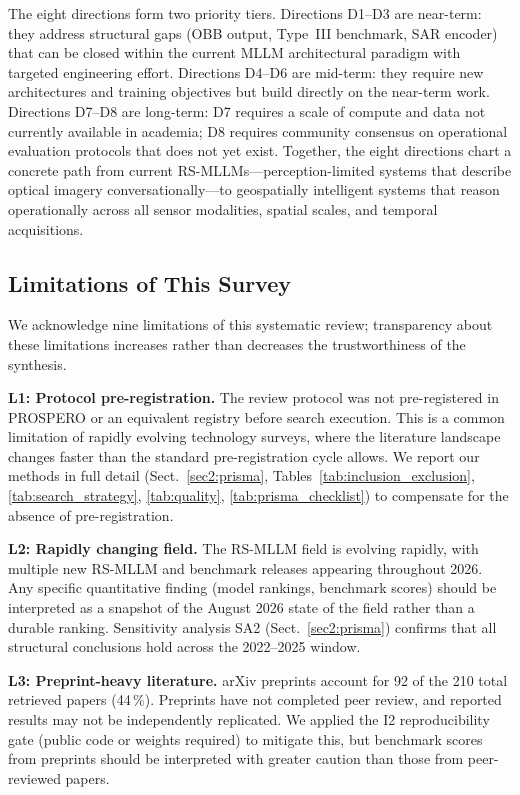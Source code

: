 The eight directions form two priority tiers. Directions D1--D3 are
near-term: they address structural gaps (OBB output, Type~III benchmark,
SAR encoder) that can be closed within the current MLLM architectural
paradigm with targeted engineering effort. Directions D4--D6 are mid-term:
they require new architectures and training objectives but build directly
on the near-term work. Directions D7--D8 are long-term: D7 requires a
scale of compute and data not currently available in academia; D8 requires
community consensus on operational evaluation protocols that does not yet
exist. Together, the eight directions chart a concrete path from current
RS-MLLMs---perception-limited systems that describe optical imagery
conversationally---to geospatially intelligent systems that reason
operationally across all sensor modalities, spatial scales, and temporal
acquisitions.

\subsection{Limitations of This Survey}\label{sec9:limitations}

We acknowledge nine limitations of this systematic review; transparency about
these limitations increases rather than decreases the trustworthiness of the synthesis.

\textbf{L1: Protocol pre-registration.} The review protocol was not
pre-registered in PROSPERO or an equivalent registry before search
execution. This is a common limitation of rapidly evolving technology
surveys, where the literature landscape changes faster than the standard
pre-registration cycle allows. We report our methods in full detail
(Sect.~\ref{sec2:prisma}, Tables~\ref{tab:inclusion_exclusion},
\ref{tab:search_strategy}, \ref{tab:quality}, \ref{tab:prisma_checklist})
to compensate for the absence of pre-registration.

\textbf{L2: Rapidly changing field.} The RS-MLLM field is evolving
rapidly, with multiple new RS-MLLM and benchmark releases appearing
throughout 2026. Any specific quantitative finding (model rankings,
benchmark scores) should be
interpreted as a snapshot of the August 2026 state of the field rather
than a durable ranking. Sensitivity analysis SA2 (Sect.~\ref{sec2:prisma})
confirms that all structural conclusions hold across the 2022--2025
window.

\textbf{L3: Preprint-heavy literature.} arXiv preprints account for
92 of the 210 total retrieved papers (44\,\%). Preprints have not completed peer
review, and reported results may not be independently replicated. We
applied the I2 reproducibility gate (public code or weights required)
to mitigate this, but benchmark scores from preprints should be
interpreted with greater caution than those from peer-reviewed papers.

